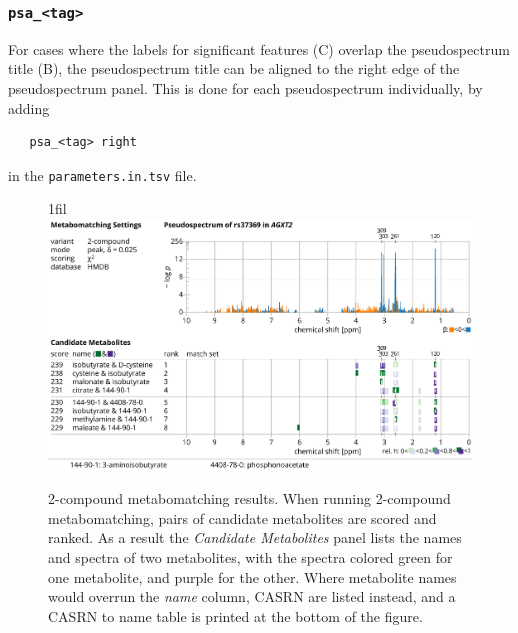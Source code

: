 \documentclass[a4paper,11pt]{article}
\makeatletter
\newcommand*{\centerfloat}{%
  \parindent \z@
  \leftskip \z@ \@plus 1fil \@minus \textwidth
  \rightskip\leftskip
  \parfillskip \z@skip}
\makeatother
\begin{document}
\subsubsection{\texttt{psa\_<tag>}}
For cases where the labels for significant features (C) overlap the pseudospectrum title (B), the pseudospectrum title can be aligned to the right edge of the pseudospectrum panel. This is done for each pseudospectrum individually, by adding
\begin{verbatim}
   psa_<tag> right
\end{verbatim}
in the \verb|parameters.in.tsv| file.
\begin{figure}
\centerfloat
\includegraphics[width=18cm]{f2.pdf}
\caption{2-compound metabomatching results. When running 2-compound metabomatching, pairs of candidate metabolites are scored and ranked. As a result the \emph{Candidate Metabolites} panel lists the names and spectra of two metabolites, with the spectra colored green for one metabolite, and purple for the other. Where metabolite names would overrun the \emph{name} column, CASRN are listed instead, and a CASRN to name table is printed at the bottom of the figure. \label{fig:2}}
\end{figure}
\end{document}
